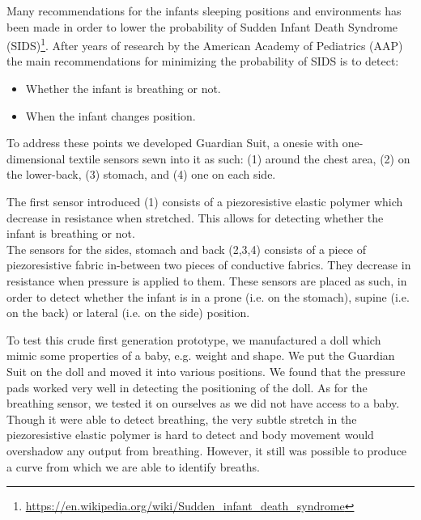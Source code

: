 \documentclass{sigchi-ext}
\begin{document}
Many recommendations for the infants sleeping positions and environments has been made in order to lower the probability of Sudden Infant Death Syndrome (SIDS)\footnote{\url{https://en.wikipedia.org/wiki/Sudden_infant_death_syndrome}}. After years of research by the American Academy of Pediatrics (AAP) \cite{aap-1992,aap-1996,aap-2005} the main recommendations for minimizing the probability of SIDS is to detect:
\begin{itemize}
  \item Whether the infant is breathing or not.
  \item When the infant changes position.
\end{itemize}
To address these points we developed Guardian Suit, a onesie with one-dimensional textile sensors sewn into it as such: (1) around the chest area, (2) on the lower-back, (3) stomach, and (4) one on each side.

The first sensor introduced (1) consists of a piezoresistive elastic polymer
which decrease in resistance when stretched. This allows for detecting whether
the infant is breathing or not.\\
The sensors for the sides, stomach and back (2,3,4) consists of a piece of
piezoresistive fabric in-between two pieces of conductive fabrics. 
They decrease in resistance when pressure is applied to them. 
These sensors are placed as such, in order to detect whether the infant is in a
prone (i.e. on the stomach), supine (i.e. on the back) or lateral (i.e. on the
side) position.

To test this crude first generation prototype, we manufactured a doll which 
mimic some properties of a baby, e.g. weight and shape. We put the Guardian Suit
on the doll and moved it into various positions. We found that the pressure pads
worked very well in detecting the positioning of the doll. As for the breathing
sensor, we tested it on ourselves as we did not have access to a baby. Though
it were able to detect breathing, the very subtle stretch in the piezoresistive
elastic polymer is hard to detect and body movement would overshadow any output
from breathing. However, it still was possible to produce a curve from which 
we are able to identify breaths.
\end{document}
